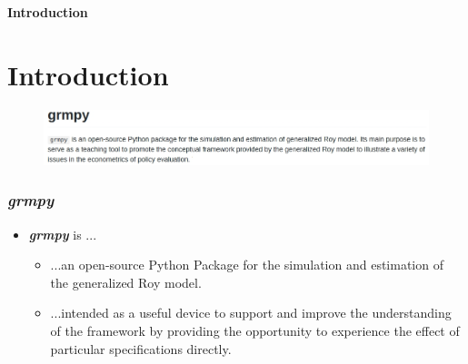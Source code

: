 \begin{frame}\begin{center}
\LARGE\textbf{Introduction}
\end{center}\end{frame}

\section{Introduction}
\begin{frame}
\begin{figure}
  \includegraphics[scale=0.3]{../04_grmpy_tutorial_notebook/grmpy_intro.jpg}
\end{figure}
\end{frame}

\begin{frame}
\frametitle{\textit{grmpy}}

\begin{itemize}\setlength\itemsep{1em}
  \item \textit{\textbf{grmpy}} is ...
    \begin{itemize}\setlength\itemsep{1em}
      \item ...an open-source Python Package for the simulation and estimation of the generalized Roy model.
      \item ...intended as a useful device to support and improve the understanding of the framework by providing the opportunity to experience the effect of particular specifications directly.
    \end{itemize}
\end{itemize}
\end{frame}
